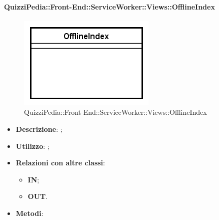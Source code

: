 \paragraph[QuizziPedia::Front-End::ServiceWorker::Views::OfflineIndex]{QuizziPedia::Front-End::ServiceWorker::Views::OfflineIndex}
\begin{figure} [ht]
	\centering
	\includegraphics[scale=0.80]{UML/Classi/Front-End/QuizziPedia_Front-End_ServiceWorker_Views_OfflineIndex.png}
	\caption{QuizziPedia::Front-End::ServiceWorker::Views::OfflineIndex}
\end{figure} \FloatBarrier
\begin{itemize}
	\item \textbf{Descrizione}: ;
	\item \textbf{Utilizzo}: ;
	\item \textbf{Relazioni con altre classi}:
	\begin{itemize}
		\item \textbf{IN};
		\item \textbf{OUT}.
	\end{itemize}
	\item \textbf{Metodi}:
\end{itemize}

